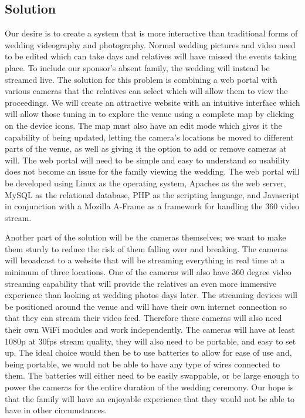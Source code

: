 \documentclass[onecolumn, draftclsnofoot,10pt, compsoc]{IEEEtran}
\begin{document}
    \subsection{Solution}
    Our desire is to create a system that is more interactive than traditional forms of wedding videography and photography.
    Normal wedding pictures and video need to be edited which can take days and relatives will have missed the events taking place.
    To include our sponsor's absent family, the wedding will instead be streamed live. 
    The solution for this problem is combining a web portal with various cameras that the relatives can select which will allow them to view the proceedings.
    We will create an attractive website with an intuitive interface which will allow those tuning in to explore the venue using a complete map by clicking on the device icons. 
    The map must also have an edit mode which gives it the capability of being updated, letting the camera's locations be moved to different parts of the venue, as well as giving it the option to add or remove cameras at will.
    The web portal will need to be simple and easy to understand so usability does not become an issue for the family viewing the wedding.
    The web portal will be developed using Linux as the operating system, Apaches as the web server, MySQL as the relational database, PHP as the scripting language, and Javascript in conjunction with a Mozilla A-Frame as a framework for handling the 360 video stream. 
    \newpage
    
    Another part of the solution will be the cameras themselves; we want to make them sturdy to reduce the risk of them falling over and breaking. 
    The cameras will broadcast to a website that will be streaming everything in real time at a minimum of three locations. 
    One of the cameras will also have 360 degree video streaming capability that will provide the relatives an even more immersive experience than looking at wedding photos days later.  
    The streaming devices will be positioned around the venue and will have their own internet connection so that they can stream their video feed.
    Therefore these cameras will also need their own WiFi modules and work independently.
    The cameras will have at least 1080p at 30fps stream quality, they will also need to be portable, and easy to set up.
    The ideal choice would then be to use batteries to allow for ease of use and, being portable, we would not be able to have any type of wires connected to them.
    The batteries will either need to be easily swappable, or be large enough to power the cameras for the entire duration of the wedding ceremony.
    Our hope is that the family will have an enjoyable experience that they would not be able to have in other circumstances.
\end{document}
